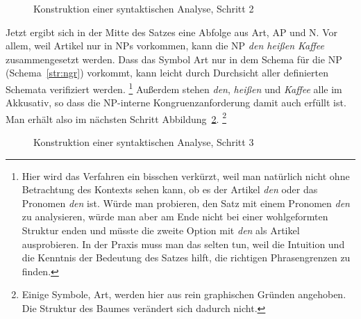 \begin{figure}[!htbp]
  \caption{Konstruktion einer syntaktischen Analyse, Schritt 2}
  \label{fig:sya02}
\end{figure}

Jetzt ergibt sich in der Mitte des Satzes eine Abfolge aus Art, AP und N.
Vor allem, weil Artikel nur in NPs vorkommen, kann die NP \textit{den heißen Kaffee} zusammengesetzt werden.
Dass das Symbol Art nur in dem Schema für die NP (Schema~\ref{str:ngr}) vorkommt, kann leicht durch Durchsicht aller definierten Schemata verifiziert werden.%
\footnote{Hier wird das Verfahren ein bisschen verkürzt, weil man natürlich nicht ohne Betrachtung des Kontexts sehen kann, ob es der Artikel \textit{den} oder das Pronomen \textit{den} ist.
Würde man probieren, den Satz mit einem Pronomen \textit{den} zu analysieren, würde man aber am Ende nicht bei einer wohlgeformten Struktur enden und müsste die zweite Option mit \textit{den} als Artikel ausprobieren.
In der Praxis muss man das selten tun, weil die Intuition und die Kenntnis der Bedeutung des Satzes hilft, die richtigen Phrasengrenzen zu finden.}
Außerdem stehen \textit{den}, \textit{heißen} und \textit{Kaffee} alle im Akkusativ, so dass die NP-interne Kongruenzanforderung damit  auch erfüllt ist.
Man erhält also im nächsten Schritt Abbildung~\ref{fig:sya03}.%
\footnote{Einige Symbole, \zB Art, werden hier aus rein graphischen Gründen angehoben.
Die Struktur des Baumes verändert sich dadurch nicht.}

\begin{figure}[!htbp]
  \caption{Konstruktion einer syntaktischen Analyse, Schritt 3}
  \label{fig:sya03}
\end{figure}


